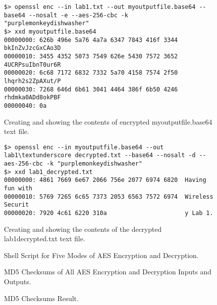 \documentclass{article}
\begin{document}
\begin{figure}
\begin{mdframed}
\begin{lstlisting}
$> openssl enc --in lab1.txt --out myoutputfile.base64 --base64 --nosalt -e --aes-256-cbc -k "purplemonkeydishwasher"
$> xxd myoutputfile.base64
00000000: 626b 496e 5a76 4a7a 6347 7843 416f 3344  bkInZvJzcGxCAo3D
00000010: 3455 4352 5073 7549 626e 5430 7572 3652  4UCRPsuIbnT0ur6R
00000020: 6c68 7172 6832 7332 5a70 4158 7574 2f50  lhqrh2s2ZpAXut/P
00000030: 7268 646d 6b61 3041 4464 386f 6b50 4246  rhdmka0ADd8okPBF
00000040: 0a
\end{lstlisting}
\end{mdframed}
\caption{Creating and showing the contents of encrypted myoutputfile.base64 text file.}
\label{fig:step1d}
\end{figure}

\begin{figure}
\begin{mdframed}
\begin{lstlisting}
$> openssl enc --in myoutputfile.base64 --out lab1\textunderscore decrypted.txt --base64 --nosalt -d --aes-256-cbc -k "purplemonkeydishwasher"
$> xxd lab1_decrypted.txt
00000000: 4861 7669 6e67 2066 756e 2077 6974 6820  Having fun with 
00000010: 5769 7265 6c65 7373 2053 6563 7572 6974  Wireless Securit
00000020: 7920 4c61 6220 310a                      y Lab 1.
\end{lstlisting}
\end{mdframed}
\caption{Creating and showing the contents of the decrypted lab1\textunderscore decrypted.txt text file.}
\label{fig:step1e}
\end{figure}

\begin{figure}
\begin{mdframed}

\end{mdframed}
\caption{Shell Script for Five Modes of AES Encryption and Decryption.}
\label{fig:step1fa}
\end{figure}

\begin{figure}
\begin{mdframed}

\end{mdframed}
\caption{MD5 Checksums of All AES Encryption and Decryption Inputs and Outputs.}
\label{fig:step1fb}
\end{figure}

\begin{figure}
\begin{mdframed}

\end{mdframed}
\caption{MD5 Checksums Result.}
\label{fig:step1fc}
\end{figure}
\end{document}
